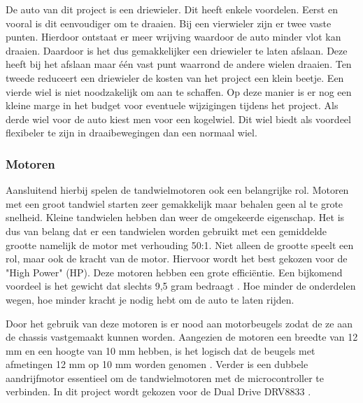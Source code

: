 \documentclass[a4paper,twoside,kulak]{kulakreport} %
\begin{document}
De auto van dit project is een driewieler. Dit heeft enkele voordelen. Eerst en vooral is dit eenvoudiger om te draaien. Bij een vierwieler zijn er twee vaste punten. Hierdoor ontstaat er meer wrijving waardoor de auto minder vlot kan draaien. Daardoor is het dus gemakkelijker een driewieler te laten afslaan. Deze heeft bij het afslaan maar één vast punt waarrond de andere wielen draaien.
Ten tweede reduceert een driewieler de kosten van het project een klein beetje. Een vierde wiel is niet noodzakelijk om aan te schaffen. Op deze manier is er nog een kleine marge in het budget voor eventuele wijzigingen tijdens het project. Als derde wiel voor de auto kiest men voor een kogelwiel. Dit wiel biedt als voordeel flexibeler te zijn in draaibewegingen dan een normaal wiel. 
\label{Wielen}


\subsubsection{Motoren}
Aansluitend hierbij spelen de tandwielmotoren ook een belangrijke rol. Motoren met een groot tandwiel starten zeer gemakkelijk maar behalen geen al te grote snelheid. Kleine tandwielen hebben dan weer de omgekeerde eigenschap. Het is dus van belang dat er een tandwielen worden gebruikt met een gemiddelde grootte namelijk de motor met verhouding 50:1. Niet alleen de grootte speelt een rol, maar ook de kracht van de motor. Hiervoor wordt het best gekozen voor de "High Power" (HP). Deze motoren hebben een grote efficiëntie.
Een bijkomend voordeel is het gewicht dat slechts 9,5 gram bedraagt \cite{MicroMetalGearMotor50:1HP}. %
Hoe minder de onderdelen wegen, hoe minder kracht je nodig hebt om de auto te laten rijden. 

Door het gebruik van deze motoren is er nood aan motorbeugels zodat de ze aan de chassis  vastgemaakt kunnen worden. Aangezien de motoren een breedte van 12 mm en een hoogte van 10 mm hebben, is het logisch dat de beugels met afmetingen 12 mm op 10 mm worden genomen \cite{MicroMetalGearMotorBeugel}.
Verder is een dubbele aandrijfmotor essentieel om de tandwielmotoren met de microcontroller te verbinden. In dit project wordt gekozen voor de Dual Drive DRV8833 \cite{DualDriveDRV8833}. 
\label{Motoren}
\end{document}
